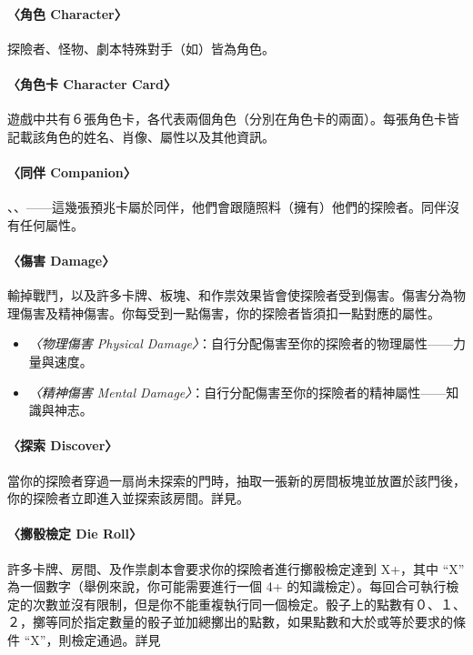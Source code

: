 \paragraph{〈角色 Character〉}
探險者、怪物、劇本特殊對手（如）皆為角色。

\paragraph{〈角色卡 Character Card〉}
遊戲中共有６張角色卡，各代表兩個角色（分別在角色卡的兩面）。每張角色卡皆記載該角色的姓名、肖像、屬性以及其他資訊。

\paragraph{〈同伴 Companion〉}
、、——這幾張預兆卡屬於同伴，他們會跟隨照料（擁有）他們的探險者。同伴沒有任何屬性。

\paragraph{〈傷害 Damage〉}

輸掉戰鬥，以及許多卡牌、板塊、和作祟效果皆會使探險者受到傷害。傷害分為物理傷害及精神傷害。你每受到一點傷害，你的探險者皆須扣一點對應的屬性。

\begin{itemize}
  \item \textit{〈物理傷害 Physical Damage〉}：自行分配傷害至你的探險者的物理屬性——力量與速度。
  \item \textit{〈精神傷害 Mental Damage〉}：自行分配傷害至你的探險者的精神屬性——知識與神志。
\end{itemize}

\paragraph{〈探索 Discover〉}
當你的探險者穿過一扇尚未探索的門時，抽取一張新的房間板塊並放置於該門後，你的探險者立即進入並探索該房間。詳見。

\paragraph{〈擲骰檢定 Die Roll〉}
許多卡牌、房間、及作祟劇本會要求你的探險者進行擲骰檢定達到 X+，其中 “X” 為一個數字（舉例來說，你可能需要進行一個 4+ 的知識檢定）。每回合可執行檢定的次數並沒有限制，但是你不能重複執行同一個檢定。骰子上的點數有０、１、２，擲等同於指定數量的骰子並加總擲出的點數，如果點數和大於或等於要求的條件 “X”，則檢定通過。詳見 

